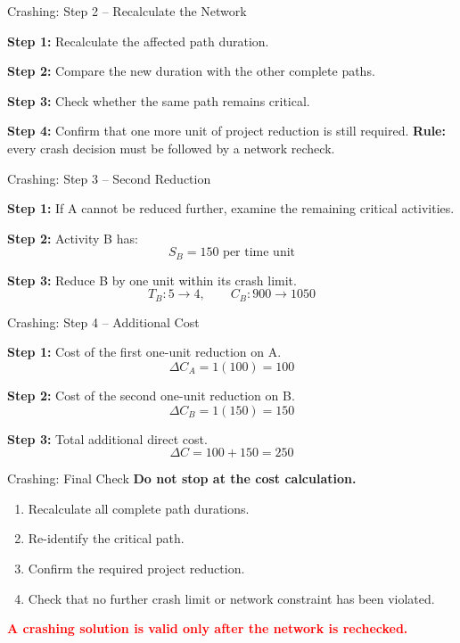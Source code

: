 \documentclass[aspectratio=169,10pt]{beamer}
\newcommand{\criticaltext}[1]{\begin{center}\parbox{0.78\textwidth}{\centering\textcolor{Red}{\textbf{#1}}}\end{center}}
\begin{document}
\begin{frame}{Crashing: Step 2 -- Recalculate the Network}
\small
\par\textbf{Step 1:} Recalculate the affected path duration.
\pause
\par\textbf{Step 2:} Compare the new duration with the other complete paths.
\pause
\par\textbf{Step 3:} Check whether the same path remains critical.
\pause
\par\textbf{Step 4:} Confirm that one more unit of project reduction is still required.
\textbf{Rule:} every crash decision must be followed by a network recheck.
\end{frame}

\begin{frame}{Crashing: Step 3 -- Second Reduction}
\small
\par\textbf{Step 1:} If A cannot be reduced further, examine the remaining critical activities.
\pause
\par\textbf{Step 2:} Activity B has:
\[
S_B=\boxed{150\text{ per time unit}}
\]
\pause
\par\textbf{Step 3:} Reduce B by one unit within its crash limit.
\[
T_B:5\rightarrow4,\qquad C_B:900\rightarrow1050
\]
\end{frame}

\begin{frame}{Crashing: Step 4 -- Additional Cost}
\small
\par\textbf{Step 1:} Cost of the first one-unit reduction on A.
\[
\Delta C_A=1(100)=\boxed{100}
\]
\pause
\par\textbf{Step 2:} Cost of the second one-unit reduction on B.
\[
\Delta C_B=1(150)=\boxed{150}
\]
\pause
\par\textbf{Step 3:} Total additional direct cost.
\[
\Delta C=100+150=\boxed{250}
\]
\end{frame}

\begin{frame}{Crashing: Final Check}
\textbf{Do not stop at the cost calculation.}
\pause
\begin{enumerate}
  \item Recalculate all complete path durations.
  \pause
  \item Re-identify the critical path.
  \pause
  \item Confirm the required project reduction.
  \pause
  \item Check that no further crash limit or network constraint has been violated.
\end{enumerate}
\pause
\criticaltext{A crashing solution is valid only after the network is rechecked.}
\end{frame}
\end{document}
